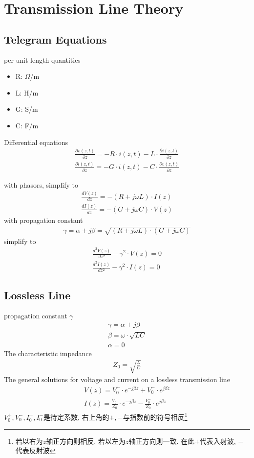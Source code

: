 \documentclass[a4paper]{report}
\begin{document}
\chapter{Transmission Line Theory}
\section{Telegram Equations}
per-unit-length quantities
\begin{itemize}
  \item R: $\Omega$/m
  \item L: H/m
  \item G: S/m
  \item C: F/m
\end{itemize}
Differential equations
\begin{align*}
  \frac{\partial v(z,t) }{\partial z}=-R\cdot i(z,t)-L\cdot \frac{\partial i(z,t) }{\partial z}
  \\ \frac{\partial i(z,t) }{\partial z}=-G\cdot i(z,t)-C\cdot \frac{\partial v(z,t) }{\partial z}
\end{align*}

with phasors, simplify to
\begin{align*}
  \frac{d V(z)}{dz}=-(R+j\omega L)\cdot I(z)
  \\ \frac{d I(z)}{dz}=-(G+j\omega C)\cdot V(z)
\end{align*}
with propagation constant
\begin{align*}
  \gamma= \alpha+j\beta=\sqrt{(R+j\omega L)\cdot (G+j\omega C)}
\end{align*}
simplify to 
\begin{align*}
  \frac{d^2 V(z)}{dz^2}-\gamma^2\cdot V(z)=0
  \\ \frac{d^2 I(z)}{dz^2}-\gamma^2\cdot I(z)=0
\end{align*}
\section{Lossless Line}
propagation constant $\gamma$
\begin{align*}
  \gamma=\alpha+j\beta
  \\ \beta=\omega\cdot\sqrt{LC}
  \\ \alpha=0
\end{align*}
The characteristic impedance 
\begin{align*}
  Z_0=\sqrt{\frac{L}{C}}
\end{align*}
The general solutions for voltage and current on a lossless transmission line
\begin{align}
  V(z)=V_0^+\cdot e^{-j\beta z}+V_0^-\cdot e^{j\beta z}
  \\I(z)=\frac{V_0^+}{Z_0}\cdot e^{-j\beta z}-\frac{V_0^-}{Z_0}\cdot e^{j\beta z}
  \label{eq:general_solution}
\end{align}
$V_0^+,V_0^-,I_0^+,I_0^-$是待定系数, 右上角的$+,-$与指数前的符号相反\footnote{若以右为$z$轴正方向则相反, 若以左为$z$轴正方向则一致. 在此$+$代表入射波, $-$代表反射波}
\end{document}
